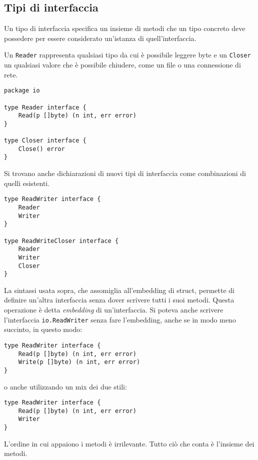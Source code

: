 \documentclass[../../thesis.tex]{subfiles}
\begin{document}
    \subsection{Tipi di interfaccia}\label{subsec:tipi-di-interfaccia}
    Un tipo di interfaccia specifica un insieme di metodi che un tipo concreto deve possedere per essere considerato un'istanza di quell'interfaccia.
    \hfill \vspace{12pt}

    Un \verb"Reader" rappresenta qualsiasi tipo da cui è possibile leggere byte e un \verb"Closer" un qualsiasi valore che è possibile chiudere, come un file o una connessione di rete.
    \begin{lstlisting}[frame = single, label = {lst:lstlisting6-2.1}]
package io

type Reader interface {
    Read(p []byte) (n int, err error)
}

type Closer interface {
    Close() error
}
    \end{lstlisting}
    Si trovano anche dichiarazioni di nuovi tipi di interfaccia come combinazioni di quelli esistenti.
    \begin{lstlisting}[frame = single, label = {lst:lstlisting6-2.2}]
type ReadWriter interface {
    Reader
    Writer
}

type ReadWriteCloser interface {
    Reader
    Writer
    Closer
}
    \end{lstlisting}
    La sintassi usata sopra, che assomiglia all'embedding di struct, permette di definire un'altra interfaccia senza dover scrivere tutti i suoi metodi.
    Questa operazione è detta \textit{embedding} di un'interfaccia.
    Si poteva anche scrivere l'interfaccia \verb"io.ReadWriter" senza fare l'embedding, anche se in modo meno succinto, in questo modo:
    \begin{lstlisting}[frame = single, label = {lst:lstlisting6-2.3}]
type ReadWriter interface {
    Read(p []byte) (n int, err error)
    Write(p []byte) (n int, err error)
}
    \end{lstlisting}
    \clearpage
    \newpage
    o anche utilizzando un mix dei due stili:
    \begin{lstlisting}[frame = single, label = {lst:lstlisting6-2.4}]
type ReadWriter interface {
    Read(p []byte) (n int, err error)
    Writer
}
    \end{lstlisting}
    L'ordine in cui appaiono i metodi è irrilevante.
    Tutto ciò che conta è l'insieme dei metodi.
\end{document}
